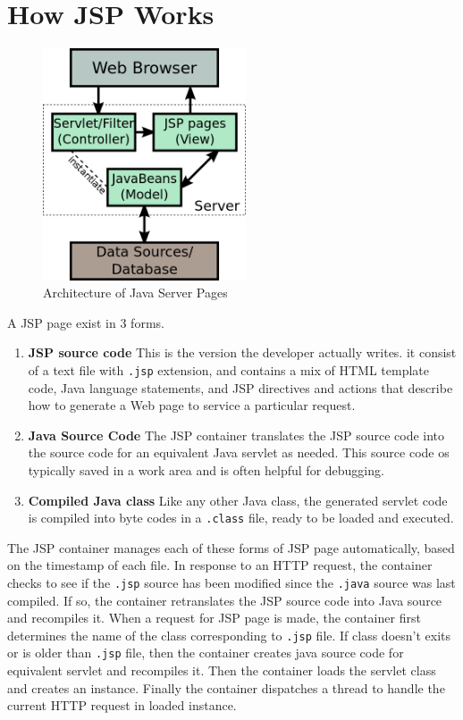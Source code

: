 \section{How JSP Works}
\begin{figure}[htbp]
\begin{center}
\includegraphics[width=6cm]{./NetworkingTechnologies/jsp/JSP.png}
\caption{Architecture of Java Server Pages}
\label{jsp}
\end{center}
\end{figure}



A JSP page exist in 3 forms.
\begin{enumerate}
	\item \textbf{JSP source code}   This is the version the developer actually writes. it consist of a text file with \texttt{.jsp} extension, and contains a mix of HTML template code, Java language statements, and JSP directives and actions that describe how to generate a Web page to service a particular request.
	\item \textbf{Java Source Code}   The JSP container translates the JSP source code into the source code for an equivalent Java servlet as needed. This source code os typically saved in a work area and is often helpful for debugging.
	\item \textbf{Compiled Java class}   Like any other Java class, the generated servlet code is compiled into byte codes in a \texttt{.class} file, ready to be loaded and executed.
\end{enumerate}
The JSP container manages each of these forms of JSP page automatically, based on the timestamp of each file. In response to an HTTP request, the container checks to see if the \texttt{.jsp} source has been modified since the \texttt{.java} source was last compiled. If so, the container retranslates the JSP source code into Java source and recompiles it. When a request for JSP page is made, the container first determines the name of the class corresponding to \texttt{.jsp} file. If class doesn't exits or is older than \texttt{.jsp} file, then the container creates java source code for equivalent servlet and recompiles it. Then the container loads the servlet class and creates an instance. Finally the container dispatches a thread to handle the current HTTP request in loaded instance.
